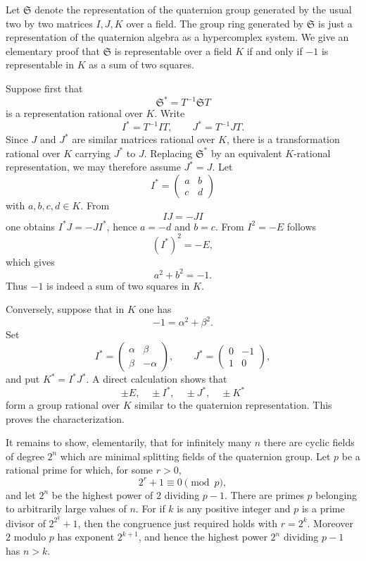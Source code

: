 \documentclass[
  12pt,
]{article}
\begin{document}
Let \(\mathfrak S\) denote the representation of the quaternion group
generated by the usual two by two matrices \(I,J,K\) over a field. The
group ring generated by \(\mathfrak S\) is just a representation of the
quaternion algebra as a hypercomplex system. We give an elementary proof
that \(\mathfrak S\) is representable over a field \(K\) if and only if
\(-1\) is representable in \(K\) as a sum of two squares.

Suppose first that \[
  \mathfrak S^*=T^{-1}\mathfrak S T
\] is a representation rational over \(K\). Write \[
  I^*=T^{-1}IT,
  \qquad
  J^*=T^{-1}JT.
\] Since \(J\) and \(J^*\) are similar matrices rational over \(K\),
there is a transformation rational over \(K\) carrying \(J^*\) to \(J\).
Replacing \(\mathfrak S^*\) by an equivalent \(K\)-rational
representation, we may therefore assume \(J^*=J\). Let \[
  I^*=\begin{pmatrix}a&b\\ c&d\end{pmatrix}
\] with \(a,b,c,d\in K\). From \[
  IJ=-JI
\] one obtains \(I^*J=-JI^*\), hence \(a=-d\) and \(b=c\). From
\(I^2=-E\) follows \[
  (I^*)^2=-E,
\] which gives \[
  a^2+b^2=-1.
\] Thus \(-1\) is indeed a sum of two squares in \(K\).

Conversely, suppose that in \(K\) one has \[
  -1=\alpha^2+\beta^2.
\] Set \[
  I^*=\begin{pmatrix}\alpha&\beta\\ \beta&-\alpha\end{pmatrix},
  \qquad
  J^*=\begin{pmatrix}0&-1\\1&0\end{pmatrix},
\] and put \(K^*=I^*J^*\). A direct calculation shows that \[
  \pm E,
  \quad \pm I^*,
  \quad \pm J^*,
  \quad \pm K^*
\] form a group rational over \(K\) similar to the quaternion
representation. This proves the characterization.

It remains to show, elementarily, that for infinitely many \(n\) there
are cyclic fields of degree \(2^n\) which are minimal splitting fields
of the quaternion group. Let \(p\) be a rational prime for which, for
some \(r>0\), \[
  2^r+1\equiv0\pmod p,
\] and let \(2^n\) be the highest power of \(2\) dividing \(p-1\). There
are primes \(p\) belonging to arbitrarily large values of \(n\). For if
\(k\) is any positive integer and \(p\) is a prime divisor of
\(2^{2^k}+1\), then the congruence just required holds with \(r=2^k\).
Moreover \(2\) modulo \(p\) has exponent \(2^{k+1}\), and hence the
highest power \(2^n\) dividing \(p-1\) has \(n>k\).
\end{document}
